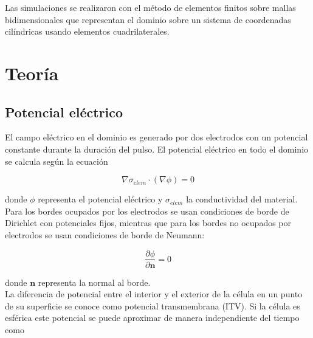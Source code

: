 \documentclass[a4paper,10pt]{article}
\begin{document}
Las simulaciones se realizaron con el método de elementos finitos sobre mallas bidimensionales que representan el dominio sobre un sistema de coordenadas cilíndricas usando elementos cuadrilaterales.



\clearpage
\section{Teoría}

\subsection{Potencial eléctrico}

El campo eléctrico en el dominio es generado por dos electrodos con un potencial constante durante la duración del pulso. El potencial eléctrico en todo el dominio se calcula según la ecuación 

\begin{equation} \label{eq:poisson}
	\nabla \sigma_{elem} \cdot (\nabla \phi) = 0 
\end{equation}

donde $\phi$ representa el potencial eléctrico y $\sigma_{elem}$ la conductividad del material. \\

Para los bordes ocupados por los electrodos se usan condiciones de borde de Dirichlet con potenciales fijos, mientras que para los bordes no ocupados por electrodos se usan condiciones de borde de Neumann:

\begin{equation}
	\frac{\partial \phi}{\partial \mathbf{n}} = 0
\end{equation}

donde $\mathbf{n}$ representa la normal al borde.\\

La diferencia de potencial entre el interior y el exterior de la célula en un punto de su superficie se conoce como potencial transmembrana (ITV). Si la célula es esférica este potencial se puede aproximar de manera independiente del tiempo como
\end{document}
